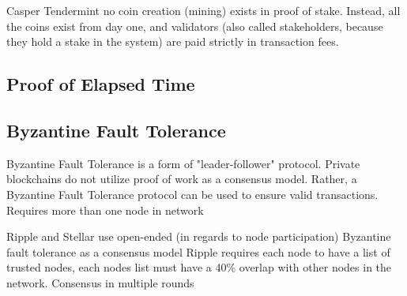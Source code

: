 Casper
Tendermint
no coin creation (mining) exists in proof of stake. Instead, all the coins exist from day one, and validators (also called stakeholders, because they hold a stake in the system) are paid strictly in transaction fees.




\subsection{Proof of Elapsed Time}


\subsection{Byzantine Fault Tolerance}
Byzantine Fault Tolerance is a form of "leader-follower" protocol. Private blockchains do not utilize proof of work as a consensus model. Rather, a Byzantine Fault Tolerance protocol can be used to ensure valid transactions. Requires more than one node in network 

Ripple and Stellar use open-ended (in regards to node participation) Byzantine fault tolerance as a consensus model
Ripple requires each node to have a list of trusted nodes, each nodes list must have a 40\% overlap with other nodes in the network. Consensus in multiple rounds

